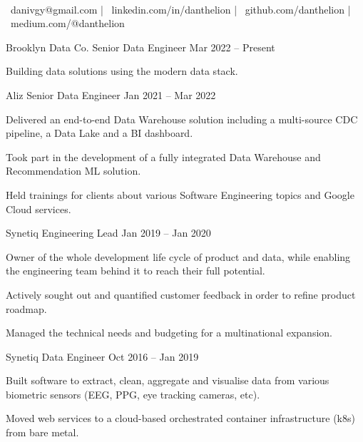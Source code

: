 \documentclass[]{awesome-cv}
\begin{document}
    
\begin{center}
	  \\
	\vspace{2mm}
	{\faEnvelope\ danivgy@gmail.com} | {\faLink\ linkedin.com/in/danthelion} | {\faLink\ github.com/danthelion} | {\faLink\ medium.com/@danthelion}
\end{center}
\begin{cventries}
	\cventry
	{Brooklyn Data Co.}
	{Senior Data Engineer}
	{Mar 2022 – Present}
	{}
	{\begin{cvitems}
		\item {Building data solutions using the modern data stack.}
		\end{cvitems}}
	\cventry
	{Aliz}
	{Senior Data Engineer}
	{Jan 2021 – Mar 2022}
	{}
	{\begin{cvitems}
		\item {Delivered an end-to-end Data Warehouse solution including a multi-source CDC pipeline, a Data Lake and a BI dashboard.}
		\item {Took part in the development of a fully integrated Data Warehouse and Recommendation ML solution.}
		\item {Held trainings for clients about various Software Engineering topics and Google Cloud services.}
		\end{cvitems}}
	\cventry
	{Synetiq}
	{Engineering Lead}
	{Jan 2019 – Jan 2020}
	{}
	{\begin{cvitems}
		\item {Owner of the whole development life cycle of product and data, while enabling the engineering team behind it to reach their full potential.}
		\item {Actively sought out and quantified customer feedback in order to refine product roadmap.}
		\item {Managed the technical needs and budgeting for a multinational expansion.}
		\end{cvitems}}
	\cventry
	{Synetiq}
	{Data Engineer}
	{Oct 2016 – Jan 2019}
	{}
	{\begin{cvitems}
		\item {Built software to extract, clean, aggregate and visualise data from various biometric sensors (EEG, PPG, eye tracking cameras, etc).}
		\item {Moved web services to a cloud-based orchestrated container infrastructure (k8s) from bare metal.}

\end{cvitems}}
\end{cventries}
\end{document}

